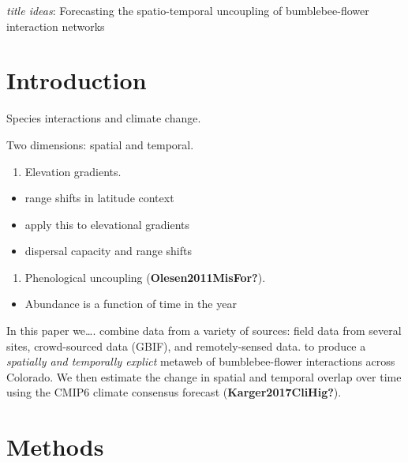 \documentclass[11pt]{article}
\begin{document}
\vfill

\clearpage
\linenumbers
\pagestyle{normal}

\emph{title ideas}: Forecasting the spatio-temporal uncoupling of
bumblebee-flower interaction networks

\hypertarget{introduction}{%
\section{Introduction}\label{introduction}}

Species interactions and climate change.

Two dimensions: spatial and temporal.

\begin{enumerate}
\def\labelenumi{\arabic{enumi})}
\tightlist
\item
  Elevation gradients.
\end{enumerate}

\begin{itemize}
\tightlist
\item
  range shifts in latitude context
\item
  apply this to elevational gradients
\item
  dispersal capacity and range shifts
\end{itemize}

\begin{enumerate}
\def\labelenumi{\arabic{enumi})}
\setcounter{enumi}{1}
\tightlist
\item
  Phenological uncoupling (\textbf{Olesen2011MisFor?}).
\end{enumerate}

\begin{itemize}
\tightlist
\item
  Abundance is a function of time in the year
\end{itemize}

In this paper we\ldots. combine data from a variety of sources: field
data from several sites, crowd-sourced data (GBIF), and remotely-sensed
data. to produce a \emph{spatially and temporally explict} metaweb of
bumblebee-flower interactions across Colorado. We then estimate the
change in spatial and temporal overlap over time using the CMIP6 climate
consensus forecast (\textbf{Karger2017CliHig?}).

\hypertarget{methods}{%
\section{Methods}\label{methods}}
\end{document}
